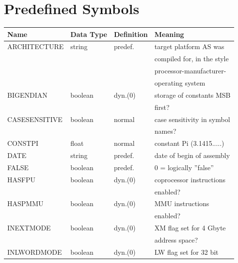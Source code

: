 \documentclass[12pt,twoside]{report}
\newcommand{\asname}{{AS}}
\begin{document}
\newcommand{\pcsymname}[0]{Program Counter Symbol}



\cleardoublepage
\chapter{Predefined Symbols}
\label{AppInternSyms}

\begin{center}\begin{longtable}{|l|l|l|l|}
\hline
Name          & Data Type & Definition & Meaning \\
\hline
\hline
\endhead
ARCHITECTURE  & string    & predef.    & target platform \asname{} was \\
              &           &            & compiled for, in the style \\
              &           &            & processor-manufacturer- \\
              &           &            & operating system \\
BIGENDIAN     & boolean   & dyn.(0)    & storage of constants MSB \\
              &           &            & first? \\
CASESENSITIVE & boolean   & normal     & case sensitivity in symbol \\
              &           &            & names? \\
CONSTPI       & float     & normal     & constant Pi (3.1415.....) \\
DATE          & string    & predef.    & date of begin of assembly \\
FALSE         & boolean   & predef.    & 0 = logically ''false'' \\
HASFPU        & boolean   & dyn.(0)    & coprocessor instructions \\
              &           &            & enabled? \\
HASPMMU       & boolean   & dyn.(0)    & MMU instructions \\
              &           &            & enabled? \\
INEXTMODE     & boolean   & dyn.(0)    & XM flag set for 4 Gbyte \\
              &           &            & address space? \\
INLWORDMODE   & boolean   & dyn.(0)    & LW flag set for 32 bit \\

\end{longtable}
\end{center}
\end{document}

